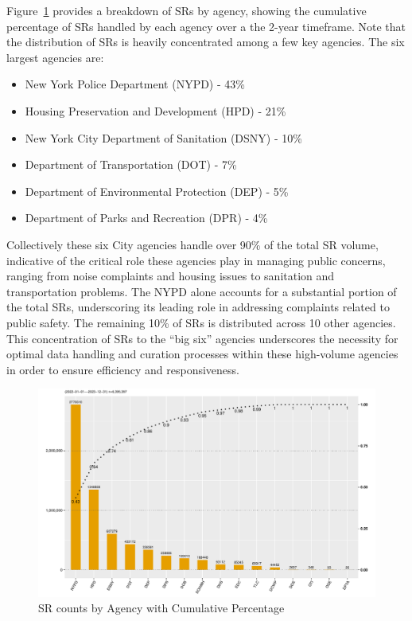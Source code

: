 \documentclass[linenumber]{jdsart}
\begin{document}
Figure~\ref{fig:SRcountbyAgency} provides a breakdown of SRs by
agency, showing the cumulative percentage of SRs handled by each
agency over a the 2-year timeframe. Note that the
distribution of SRs is heavily concentrated among a few key 
agencies. The six largest agencies are:

\begin{itemize}
    \item New York Police Department (NYPD) - 43\%
    \item Housing Preservation and Development (HPD) - 21\%
    \item New York City Department of Sanitation (DSNY) - 10\%
    \item Department of Transportation (DOT) - 7\%
    \item Department of Environmental Protection (DEP) - 5\%
    \item Department of Parks and Recreation (DPR) - 4\%
\end{itemize}

Collectively these six City agencies handle over 90\% of the total SR 
volume, indicative of the critical role these agencies play in managing
public concerns, ranging from noise complaints and housing issues to
sanitation and transportation problems. The NYPD alone accounts for a
substantial portion of the total SRs, underscoring its leading role in
addressing complaints related to public safety. The remaining
10\% of SRs is distributed across 10 other
agencies. This concentration of SRs to the ``big six'' agencies 
underscores the necessity for optimal data handling and curation processes 
within these high-volume agencies in order to ensure 
efficiency and responsiveness.


\begin{figure}[tbp]
	\centering
	\includegraphics[width = \textwidth]{SRs_by_Agency.pdf}
  	\caption{SR counts by Agency with Cumulative Percentage}
	\label{fig:SRcountbyAgency}
\end{figure}
\end{document}
